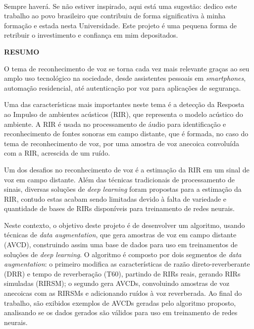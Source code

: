 \paragraph{}Sempre haverá. Se não estiver inspirado, aqui está uma sugestão: dedico este trabalho ao povo brasileiro que contribuiu de forma significativa à minha formação e estada nesta Universidade. Este projeto é uma pequena forma de retribuir o investimento e confiança em mim depositados.

\pagebreak


\begin{center}
\textbf{RESUMO}
\end{center}
      \vspace{0.5cm}

O tema de reconhecimento de voz se torna cada vez mais relevante graças ao seu amplo uso tecnológico na sociedade, desde 
assistentes pessoais em \textit{smartphones}, automação residencial, até autenticação por voz para aplicações de segurança.

Uma das características mais importantes neste tema é a detecção da Resposta ao Impulso de ambientes acústicos (RIR), que representa
o modelo acústico do ambiente. A RIR é usada no processamento de áudio para identificação e reconhecimento de fontes sonoras em campo
distante, que é formada, no caso do tema de reconhecimento de voz, por uma amostra de voz anecoica convoluída com a RIR, acrescida de um ruído. 

Um dos desafios no reconhecimento de voz é a estimação da RIR em um sinal de voz em campo distante.
Além das técnicas tradicionais de processamento de sinais, diversas soluções de \textit{deep learning} foram propostas para a estimação da RIR,
contudo estas acabam sendo limitadas devido à falta de variedade e quantidade de bases de RIRs disponíveis para treinamento de redes neurais.

Neste contexto, o objetivo deste projeto é de desenvolver um algoritmo, usando técnicas de \textit{data augmentation}, que gera amostras de voz
em campo distante (AVCD), construindo assim uma base de dados para uso em treinamentos de soluções de \textit{deep learning}. 
O algoritmo é composto por dois segmentos de \textit{data augmentation}: o primeiro modifica as características de razão direto-reverberante (DRR)
e tempo de reverberação (T60), partindo de RIRs reais, gerando RIRs simuladas (RIRSM); o segundo gera AVCDs, convoluindo amostras de voz anecoicas
com as RIRSMs e adicionando ruídos à voz reverberada. 
Ao final do trabalho, são exibidos exemplos de AVCDs geradas pelo algoritmo proposto, analisando se os dados gerados são válidos para uso 
em treinamento de redes neurais.

